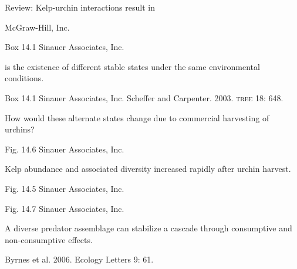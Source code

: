 \documentclass[t]{beamer}
\begin{document}
{
\begin{frame}[t]{Review: Kelp-urchin interactions result in }

	\vfilll
	
	\hfill \tiny \textcopyright McGraw-Hill, Inc.
\end{frame}
}
%
{
\begin{frame}[b]

	\vfilll
	
	\hfill \tiny Box 14.1 \textcopyright Sinauer Associates, Inc.
\end{frame}
}
%
{
\begin{frame}[b]{ is the existence of different stable states under the same environmental conditions.}

	\vfilll
	
	\tiny Box 14.1 \textcopyright Sinauer Associates, Inc. \hfill Scheffer and Carpenter. 2003. \textsc{tree} 18: 648.
\end{frame}
}
%
{
\begin{frame}[t]{How would these alternate states change due to commercial harvesting of urchins?}

	\vfilll
	
	\hfill \tiny Fig. 14.6 \textcopyright Sinauer Associates, Inc.
\end{frame}
}
%
{
\begin{frame}[t]{Kelp abundance and associated diversity increased rapidly after urchin harvest.}

	\vfilll
	
	\hfill \tiny Fig. 14.5 \textcopyright Sinauer Associates, Inc.
\end{frame}
}
%
{
\begin{frame}

	\vfilll
	
	\hfill \tiny Fig. 14.7 \textcopyright Sinauer Associates, Inc.
\end{frame}
}
%
{
\begin{frame}[t]{A diverse predator assemblage can stabilize a cascade through consumptive and non-consumptive effects.}

	\vfilll
	
	\hfill \tiny Byrnes et al. 2006. Ecology Letters 9: 61.
\end{frame}
}
\end{document}
